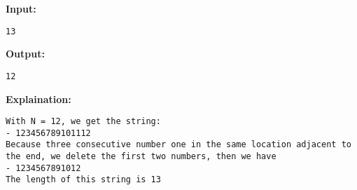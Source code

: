 \textbf{    Input:   }
\begin{verbatim}
13\end{verbatim}

\textbf{    Output:   }
\begin{verbatim}
12\end{verbatim}

\textbf{    Explaination:   }
\begin{verbatim}
With N = 12, we get the string:
- 123456789101112
Because three consecutive number one in the same location adjacent to the end, we delete the first two numbers, then we have
- 1234567891012
The length of this string is 13\end{verbatim}